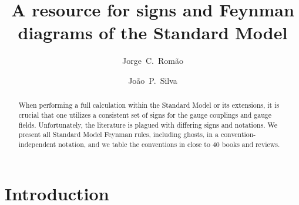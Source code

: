 \documentclass{ws-ijmpa}
\begin{document}

%
\catchline{}{}{}{}{}
%

\title{A resource for signs and Feynman diagrams of the Standard Model}

\author{Jorge~C.~Rom\~ao}

\address{Departamento de F\'\i sica and CFTP, Instituto Superior T\'ecnico\\
          Technical University of Lisbon, 1049-001 Lisboa, Portugal\\
jorge.romao@ist.utl.pt}

\author{Jo\~{a}o~P.~Silva}

\address{Instituto Superior de Engenharia de Lisboa,
	1959-007 Lisboa, Portugal\\
and\\
Centro de F\'{\i}sica Te\'{o}rica de Part\'{\i}culas (CFTP),
    Instituto Superior T\'{e}cnico, Technical University of Lisbon,
    1049-001 Lisboa, Portugal\\
jpsilva@cftp.ist.utl.pt}

\maketitle


\begin{abstract}
When performing a full calculation within the
Standard Model or its extensions,
it is crucial that one utilizes a consistent
set of signs for the gauge couplings and gauge fields.
Unfortunately, the literature is plagued with differing
signs and notations.
We present all Standard Model Feynman rules,
including ghosts,
in a convention-independent notation,
and we table the conventions in close to 40
books and reviews.

\end{abstract}


\section{Introduction}	
\end{document}
